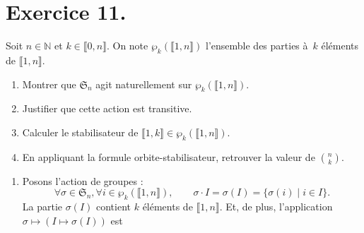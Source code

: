 \documentclass[./main]{subfiles}
\begin{document}
  \section{Exercice 11.}
  \begin{enonce}
    Soit $n \in \mathds{N}$ et $k \in \llbracket 0, n\rrbracket$. On note $\wp_k(\llbracket 1, n \rrbracket)$ l'ensemble des parties à~$k$ éléments de $\llbracket 1, n \rrbracket$.
    \begin{enumerate}
      \item Montrer que $\mathfrak{S}_n$ agit naturellement sur $\wp_k(\llbracket 1, n \rrbracket)$.
      \item Justifier que cette action est transitive.
      \item Calculer le stabilisateur de $\llbracket 1, k \rrbracket \in \wp_k(\llbracket 1, n \rrbracket)$.
      \item En appliquant la formule orbite-stabilisateur, retrouver la valeur de ${n\choose k}$.
    \end{enumerate}
  \end{enonce}

  \begin{enumerate}
    \item Posons l'action de groupes : \[
        \forall \sigma \in \mathfrak{S}_n, \forall i \in \wp_k(\llbracket 1, n \rrbracket),\quad\quad
        \sigma \cdot I = \sigma(I) = \{\sigma(i) \mid i \in I\} 
      .\]
      La partie $\sigma(I)$ contient  $k$ éléments de $\llbracket 1, n\rrbracket$.
      Et, de plus, l'application $\sigma \mapsto (I \mapsto \sigma(I))$ est 
  \end{enumerate}
\end{document}
